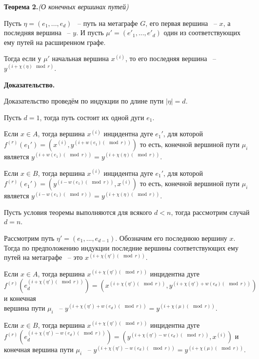 \documentclass[14pt]{mmcs-article}
\begin{document}
\textbf{Теорема 2.}\textsl{(О конечных вершинах путей)}

Пусть  $\eta = (e_1, ..., e_d)$ ~-- путь на метаграфе $G$, его первая вершина ~-- $x$, а последняя вершина ~-- $y$. И пусть $\mu' = (e'_1, ..., e'_d)$ один из соответствующих ему путей на расширенном графе.

Тогда если у $\mu'$ начальная вершина $x^{(i)}$, то его последняя вершина ~-- $y^{(i + \chi(\eta)\mod{r})}$.

\textbf{Доказательство.}


Доказательство проведём по индукции по длине пути $|\eta| = d$.

Пусть $d = 1$, тогда путь состоит их одной дуги $e_1$.

Если $x \in A$, тогда вершина $x^{(i)}$ инцидентна дуге $e_1'$, для которой $f^{(r)}(e_1') = (x^{(i)}, y^{(i + w(e_1) (\mod{r}))})$ то есть, конечной вершиной пути $\mu_i$ является $y^{(i + w(e_1) (\mod{r}))} = y^{(i + \chi(\eta) (\mod{r}))}$.

Если $x \in B$, тогда вершина $x^{(i)}$ инцидентна дуге $e_1'$, для которой $f^{(r)}(e_1') = (y^{(i - w(e_1) (\mod{r}))}, x^{(i)})$ то есть, конечной вершиной пути $\mu_i$ является $y^{(i - w(e_1) (\mod{r}))} = y^{(i + \chi(\eta) (\mod{r}))}$.

Пусть условия теоремы выполняются для всякого $d < n$, тогда рассмотрим случай $d = n$.

Рассмотрим путь $\eta' = (e_1, ..., e_{d - 1})$. Обозначим его последнюю вершину $x$. Тогда по предположению индукции последние вершины соответствующих ему путей на метаграфе ~-- это $x^{(i + \chi(\eta')(\mod{r}))}$.

Если $x \in A$, тогда вершина $x^{(i + \chi(\eta')(\mod{r}))}$ инцидентна дуге \\ $f^{(r)}(e_d^{(i + \chi(\eta')(\mod{r}))}) = (x^{(i + \chi(\eta')(\mod{r}))}, y^{(i + \chi(\eta') + w(e_d) (\mod{r}))})$ и конечная \\ вершина пути $\mu_i$ ~-- $y^{(i + \chi(\eta') + w(e_d) (\mod{r}))} = y^{(i + \chi(\mu) (\mod{r}))}$.

Если $x \in B$, тогда вершина $x^{(i + \chi(\eta')(\mod{r}))}$ инцидентна дуге \\ $f^{(r)}(e_d^{(i + \chi(\eta') - w(e_d) (\mod{r}))}) = (y^{(i + \chi(\eta') - w(e_d) (\mod{r}))}, x^{(i)})$ и конечная вершина пути $\mu_i$ ~-- $y^{(i + \chi(\eta') - w(e_d) (\mod{r}))} = y^{(i + \chi(\mu) (\mod{r}))}$.
\end{document}
